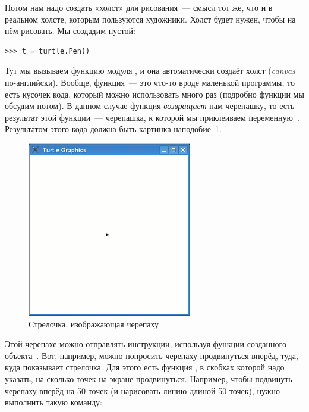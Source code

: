 Потом нам надо создать «холст» для рисования — смысл тот же, что и в реальном холсте, которым пользуются художники. Холст будет нужен, чтобы на нём рисовать. Мы создадим пустой:

\begin{listing}
\begin{verbatim}
>>> t = turtle.Pen()
\end{verbatim}
\end{listing}

Тут мы вызываем функцию  модуля , и она автоматически создаёт холст (\emph{canvas} по-английски). Вообще, функция — это что-то вроде маленькой программы, то есть кусочек кода, который можно использовать много раз (подробно функции мы обсудим потом). В данном случае функция  \emph{возвращает} нам черепашку, то есть результат этой функции — черепашка, к которой мы приклеиваем переменную . Результатом этого кода должна быть картинка наподобие \ref{fig10}.

\begin{figure}
\begin{center}
\includegraphics[width=72mm]{../en/figure10.eps}
\end{center}
\caption{Стрелочка, изображающая черепаху}\label{fig10}
\end{figure}


Этой черепахе можно отправлять инструкции, используя функции созданного объекта . Вот, например, можно попросить черепаху продвинуться вперёд, туда, куда показывает стрелочка. Для этого есть функция , в скобках которой надо указать, на сколько точек на экране продвинуться. Например, чтобы подвинуть черепаху вперёд на 50 точек (и нарисовать линию длиной 50 точек), нужно выполнить такую команду:


